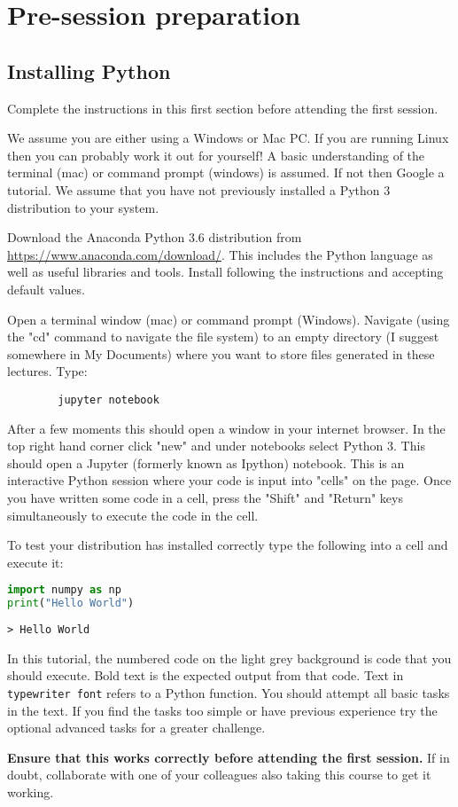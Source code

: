 \section{Pre-session preparation}
\subsection{Installing Python}
	Complete the instructions in this first section before attending the first session.
	
	We assume you are either using a Windows or Mac PC. If you are running Linux then you can probably work it out for yourself! A basic understanding of the terminal (mac) or command prompt (windows) is assumed. If not then Google a tutorial. We assume that you have not previously installed a Python 3 distribution to your system.
	
	Download the Anaconda Python 3.6 distribution from \url{https://www.anaconda.com/download/}. This includes the Python language as well as useful libraries and tools. Install following the instructions and accepting default values.

	Open a terminal window (mac) or command prompt (Windows). Navigate (using the "cd" command to navigate the file system) to an empty directory (I suggest somewhere in My Documents) where you want to store files generated in these lectures. Type:
	\begin{verbatim}
		jupyter notebook
	\end{verbatim}

After a few moments this should open a window in your internet browser. In the top right hand corner click "new" and under notebooks select Python 3. This should open a Jupyter (formerly known as Ipython) notebook. This is an interactive Python session where your code is input into "cells" on the page. Once you have written some code in a cell, press the "Shift" and "Return" keys simultaneously to execute the code in the cell.

To test your distribution has installed correctly type the following into a cell and execute it:

		\begin{lstlisting}[language=Python]
import numpy as np
print("Hello World")\end{lstlisting}
		\begin{verbatim}> Hello World\end{verbatim}
		
In this tutorial, the numbered code on the light grey background is code that you should execute. Bold text is the expected output from that code. Text in \texttt{typewriter font} refers to a Python function. You should attempt all basic tasks in the text. If you find the tasks too simple or have previous experience try the optional advanced tasks for a greater challenge.

\textbf{Ensure that this works correctly before attending the first session.} If in doubt, collaborate with one of your colleagues also taking this course to get it working.
